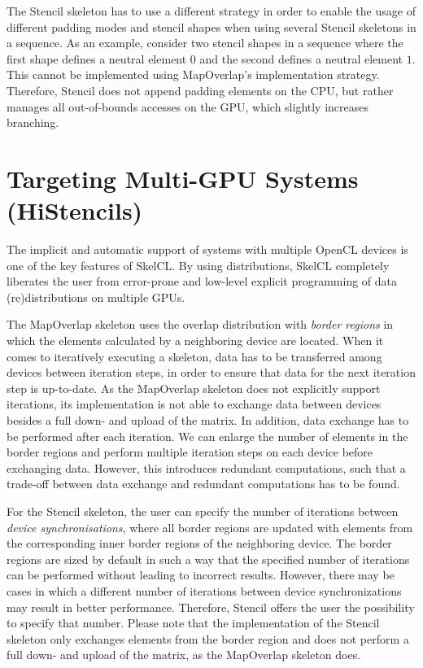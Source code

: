 The Stencil skeleton has to use a different strategy in order to enable the usage of different padding modes and stencil shapes when using several Stencil skeletons in a sequence.
As an example, consider two stencil shapes in a sequence where the first shape defines a neutral element $0$ and the second defines a neutral element $1$.
This cannot be implemented using MapOverlap's implementation strategy.
Therefore, Stencil does not append padding elements on the CPU, but rather manages all out-of-bounds accesses on the GPU, which slightly increases branching.

\section{Targeting Multi-GPU Systems (HiStencils)}
\label{sec:multi_gpu}
The implicit and automatic support of systems with multiple OpenCL devices is one of the key features of SkelCL.
By using distributions, SkelCL completely liberates the user from error-prone and low-level explicit programming of data (re)distributions on multiple GPUs. 

The MapOverlap skeleton uses the overlap distribution with \textit{border regions} in which the elements calculated by a neighboring device are located.
When it comes to iteratively executing a skeleton, data has to be transferred among devices between iteration steps, in order to ensure that data for the next iteration step is up-to-date.
As the MapOverlap skeleton does not explicitly support iterations, its implementation is not able to exchange data between devices besides a full down- and upload of the matrix.
In addition, data exchange has to be performed after each iteration.
We can enlarge the number of elements in the border regions and perform multiple iteration steps on each device before exchanging data.
However, this introduces redundant computations, such that a trade-off between data exchange and redundant computations has to be found.
 
For the Stencil skeleton, the user can specify the number of iterations between \textit{device synchronisations}, where all border regions are updated with elements from the corresponding inner border regions of the neighboring device.
The border regions are sized by default in such a way that the specified number of iterations can be performed without leading to incorrect results.
However, there may be cases in which a different number of iterations between device synchronizations may result in better performance.
Therefore, Stencil offers the user the possibility to specify that number.
Please note that the implementation of the Stencil skeleton only exchanges elements from the border region and does not perform a full down- and upload of the matrix, as the MapOverlap skeleton does.

